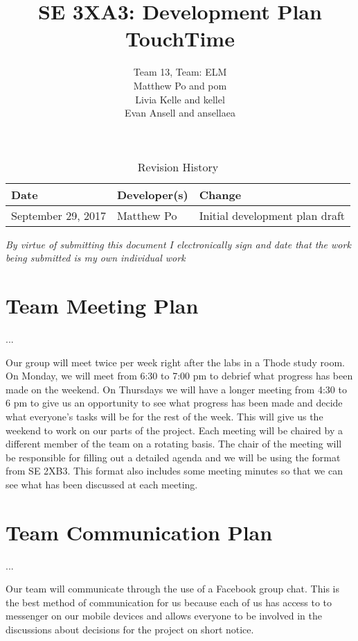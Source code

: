 \documentclass{article}
\title{SE 3XA3: Development Plan\\TouchTime}
\author{Team 13, Team: ELM
		\\ Matthew Po and pom
		\\ Livia Kelle and kellel
		\\ Evan Ansell and ansellaea
}
\date{}
\begin{document}
\begin{table}[hp]
\caption{Revision History} \label{TblRevisionHistory}
\begin{tabularx}{\textwidth}{llX}
\toprule
\textbf{Date} & \textbf{Developer(s)} & \textbf{Change}\\
\midrule
September 29, 2017 & Matthew Po & Initial development plan draft\\
\bottomrule
\end{tabularx}
\end{table}

\newpage

\maketitle

\textit{By virtue of submitting this document I electronically sign and date that the work being submitted is my own individual work}

\section{Team Meeting Plan}
...

Our group will meet twice per week right after the labs in a Thode study room. On Monday, we will meet from 6:30 to 7:00 pm to debrief what progress has been made on the weekend. On Thursdays we will have a longer meeting from 4:30 to 6 pm to give us an opportunity to see what progress has been made and decide what everyone’s tasks will be for the rest of the week. This will give us the weekend to work on our parts of the project. Each meeting will be chaired by a different member of the team on a rotating basis. The chair of the meeting will be responsible for filling out a detailed agenda and we will be using the format from SE 2XB3. This format also includes some meeting minutes so that we can see what has been discussed at each meeting. 


\section{Team Communication Plan}
...

Our team will communicate through the use of a Facebook group chat. This is the best method of communication for us because each of us has access to to messenger on our mobile devices and allows everyone to be involved in the discussions about decisions for the project on short notice. 
\end{document}
